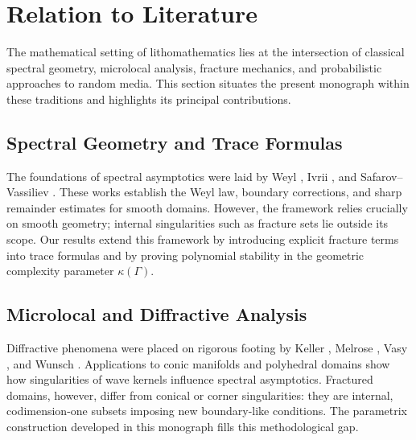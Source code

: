 
\section{Relation to Literature}

The mathematical setting of lithomathematics lies at the intersection of
classical spectral geometry, microlocal analysis, fracture mechanics, and
probabilistic approaches to random media. This section situates the present
monograph within these traditions and highlights its principal contributions.

\subsection{Spectral Geometry and Trace Formulas}

The foundations of spectral asymptotics were laid by Weyl \cite{Weyl1911},
Ivrii \cite{Ivrii1980}, and Safarov--Vassiliev \cite{SafarovVassiliev1997}.
These works establish the Weyl law, boundary corrections, and sharp remainder
estimates for smooth domains. However, the framework relies crucially on smooth
geometry; internal singularities such as fracture sets lie outside its scope.
Our results extend this framework by introducing explicit fracture terms into
trace formulas and by proving polynomial stability in the geometric complexity
parameter $\kappa(\Gamma)$.

\subsection{Microlocal and Diffractive Analysis}

Diffractive phenomena were placed on rigorous footing by Keller
\cite{Keller1962}, Melrose \cite{Melrose1980,Melrose1994}, Vasy
\cite{Vasy2008}, and Wunsch \cite{Wunsch2001}. Applications to conic manifolds
and polyhedral domains show how singularities of wave kernels influence
spectral asymptotics. Fractured domains, however, differ from conical or corner
singularities: they are internal, codimension-one subsets imposing new
boundary-like conditions. The parametrix construction developed in this
monograph fills this methodological gap.

